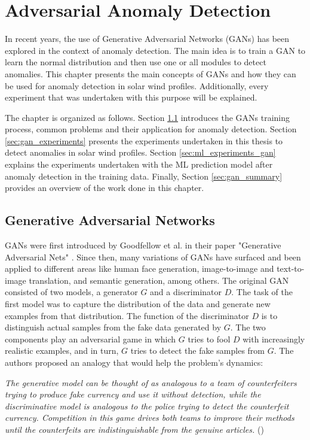 \chapter{Adversarial Anomaly Detection}\label{chap:aad}
In recent years, the use of Generative Adversarial Networks (GANs) has been explored in the context of anomaly detection. The main idea is to train a GAN to learn the normal distribution and then use one or all modules to detect anomalies. This chapter presents the main concepts of GANs and how they can be used for anomaly detection in solar wind profiles. Additionally, every experiment that was undertaken with this purpose will be explained. 

The chapter is organized as follows. Section \ref{sec:gan_background} introduces the GANs training process, common problems and their application for anomaly detection. Section \ref{sec:gan_experiments} presents the experiments undertaken in this thesis to detect anomalies in solar wind profiles. Section \ref{sec:ml_experiments_gan} explains the experiments undertaken with the ML prediction model after anomaly detection in the training data. Finally, Section \ref{sec:gan_summary} provides an overview of the work done in this chapter.

\section{Generative Adversarial Networks}\label{sec:gan_background}
GANs were first introduced by Goodfellow et al. in their paper "Generative Adversarial Nets" \cite{goodfellow.etal_GenerativeAdversarialNets_}. Since then, many variations of GANs have surfaced and been applied to different areas like human face generation, image-to-image and text-to-image translation, and semantic generation, among others. The original GAN consisted of two models, a generator $G$ and a discriminator $D$. The task of the first model was to capture the distribution of the data and generate new examples from that distribution. The function of the discriminator $D$ is to distinguish actual samples from the fake data generated by $G$. The two components play an adversarial game in which $G$ tries to fool $D$ with increasingly realistic examples, and in turn, $G$ tries to detect the fake samples from $G$. The authors proposed an analogy that would help the problem's dynamics:

\noindent\textit{The generative model can be thought of as analogous to a team of counterfeiters trying to produce fake currency and use it without detection, while the discriminative model is analogous to the police trying to detect the counterfeit currency. Competition in this game drives both teams to improve their methods until the counterfeits are indistinguishable from the genuine articles.} (\cite{goodfellow.etal_GenerativeAdversarialNets_})

